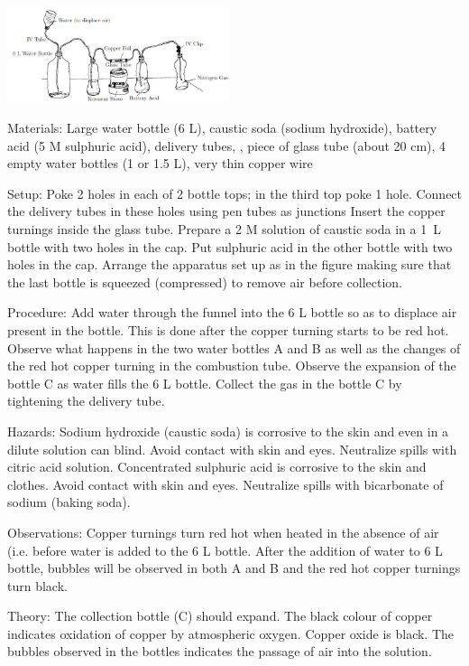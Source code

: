 \begin{multicols}{2}
\begin{center}
\includegraphics[width=0.49\textwidth]{./img/nitrogen-gas.png}
\end{center}

\begin{description*}
\item[Materials:]{Large water bottle (6 L), caustic soda (sodium hydroxide), battery acid (5 M
sulphuric acid), delivery tubes, , piece of glass tube (about 20
cm), 4 empty water bottles (1 or 1.5 L), very thin copper wire}
\item[Setup:]{Poke 2 holes in each of 2 bottle tops; in the third top poke 1 hole. Connect the delivery tubes in these holes using pen tubes as
junctions Insert the copper turnings inside the glass tube. Prepare a 2 M solution of caustic soda in a 1~L bottle with two holes in the cap. Put sulphuric acid in the other bottle with two holes in the cap.
Arrange the apparatus set up as in the figure making sure that the last
bottle is squeezed (compressed) to remove air before collection.}
\item[Procedure:]{Add water through the funnel into the 6 L bottle so as to displace air
present in the bottle. This is done after the copper turning starts
to be red hot. Observe what happens in the two water bottles A and B as well as the
changes of the red hot copper turning in the combustion tube. Observe the expansion of the bottle C as water fills the 6 L bottle. Collect the gas in the bottle C by tightening the delivery tube.}
\item[Hazards:]{Sodium hydroxide (caustic soda) is corrosive to the skin and even in a
dilute solution can blind. Avoid contact with skin and eyes. Neutralize
spills with citric acid solution. Concentrated sulphuric acid is
corrosive to the skin and clothes. Avoid contact with skin and eyes.
Neutralize spills with bicarbonate of sodium (baking soda).}
\item[Observations:]{Copper turnings turn red hot when heated in the absence of air (i.e. before
water is added to the 6 L bottle. After the addition of water to 6 L bottle,
bubbles will be observed in both A and B and the red hot copper turnings
turn black. }
\item[Theory:]{The collection bottle (C) should expand. The black colour of
copper indicates oxidation of copper by atmospheric oxygen. Copper oxide
is black. The bubbles observed in the bottles indicates the passage of air into
the solution.}
\end{description*}


\end{multicols}
